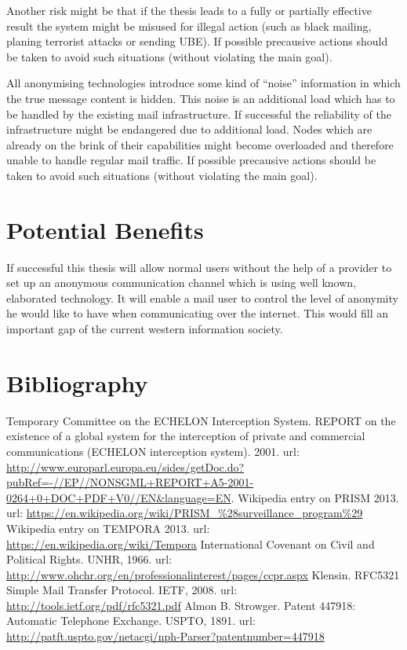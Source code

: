\documentclass[twocolumn,a4paper]{article}
\begin{document}
Another risk might be that if the thesis leads to a fully or partially effective result the system might be misused for illegal action (such as black mailing, planing terrorist attacks or sending UBE). If possible precausive actions should be taken to avoid such situations (without violating the main goal).\par

All anonymising technologies introduce some kind of "`noise"' information in which the true message content is hidden. This noise is an additional load which has to be handled by the existing mail infrastructure. If successful the reliability of the infrastructure might be endangered due to additional load. Nodes which are already on the brink of their capabilities might become overloaded and therefore unable to handle regular mail traffic. If possible precausive actions should be taken to avoid such situations (without violating the main goal).\par


\section{Potential Benefits}
If successful this thesis will allow normal users without the help of a provider to set up an anonymous communication channel which is using well known, elaborated technology. It will enable a mail user to control the level of anonymity he would like to have when communicating over the internet. This would fill an important gap of the current western information society. 

\section {Bibliography}
\begin{thebibliography}{99}
Temporary Committee on the ECHELON Interception System. REPORT on the existence of a global system for the interception of private and commercial communications (ECHELON interception system). 2001. url: \url{http://www.europarl.europa.eu/sides/getDoc.do?pubRef=-//EP//NONSGML+REPORT+A5-2001-0264+0+DOC+PDF+V0//EN&language=EN}.
Wikipedia entry on PRISM 2013. url: \url{https://en.wikipedia.org/wiki/PRISM_%28surveillance_program%29}
Wikipedia entry on TEMPORA 2013. url: \url{https://en.wikipedia.org/wiki/Tempora}
International Covenant on Civil and Political Rights. UNHR, 1966. url: \url{http://www.ohchr.org/en/professionalinterest/pages/ccpr.aspx}
 Klensin. RFC5321 Simple Mail Transfer Protocol. IETF, 2008. url: \url{http://tools.ietf.org/pdf/rfc5321.pdf}
Almon B. Strowger. Patent 447918: Automatic Telephone Exchange. USPTO, 1891. url: \url{http://patft.uspto.gov/netacgi/nph-Parser?patentnumber=447918}

\end{thebibliography}
\end{document}
